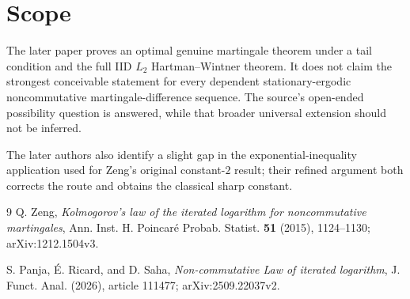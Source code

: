 \documentclass[10pt]{article}
\begin{document}
\section*{Scope}

The later paper proves an optimal genuine martingale theorem under a tail
condition and the full IID $L_2$ Hartman--Wintner theorem.  It does not claim
the strongest conceivable statement for every dependent stationary-ergodic
noncommutative martingale-difference sequence.  The source's open-ended
possibility question is answered, while that broader universal extension
should not be inferred.

The later authors also identify a slight gap in the exponential-inequality
application used for Zeng's original constant-$2$ result; their refined
argument both corrects the route and obtains the classical sharp constant.

\scriptsize
\begin{thebibliography}{9}
Q. Zeng,
\emph{Kolmogorov's law of the iterated logarithm for noncommutative
martingales}, Ann. Inst. H. Poincar\'e Probab. Statist. \textbf{51} (2015),
1124--1130; arXiv:1212.1504v3.

S. Panja, \'E. Ricard, and D. Saha,
\emph{Non-commutative Law of iterated logarithm},
J. Funct. Anal. (2026), article 111477; arXiv:2509.22037v2.
\end{thebibliography}
\end{document}
